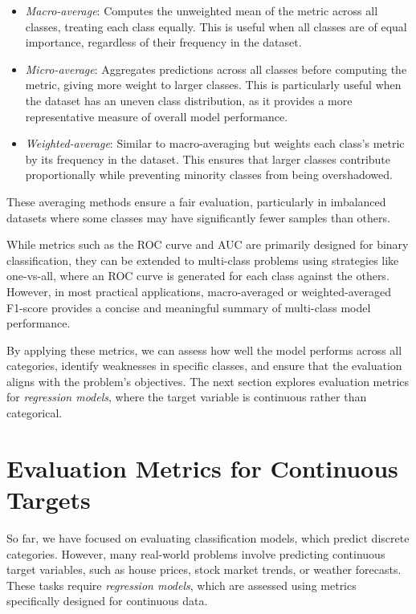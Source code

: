 \documentclass[
  11pt,
]{book}
\providecommand{\tightlist}{%
  \setlength{\itemsep}{0pt}\setlength{\parskip}{0pt}}
\theoremstyle{definition}
\theoremstyle{definition}
\theoremstyle{definition}
\theoremstyle{definition}
\theoremstyle{remark}
\begin{document}
\begin{itemize}
\tightlist
\item
  \emph{Macro-average}: Computes the unweighted mean of the metric across all classes, treating each class equally. This is useful when all classes are of equal importance, regardless of their frequency in the dataset.\\
\item
  \emph{Micro-average}: Aggregates predictions across all classes before computing the metric, giving more weight to larger classes. This is particularly useful when the dataset has an uneven class distribution, as it provides a more representative measure of overall model performance.\\
\item
  \emph{Weighted-average}: Similar to macro-averaging but weights each class's metric by its frequency in the dataset. This ensures that larger classes contribute proportionally while preventing minority classes from being overshadowed.
\end{itemize}

These averaging methods ensure a fair evaluation, particularly in imbalanced datasets where some classes may have significantly fewer samples than others.

While metrics such as the ROC curve and AUC are primarily designed for binary classification, they can be extended to multi-class problems using strategies like one-vs-all, where an ROC curve is generated for each class against the others. However, in most practical applications, macro-averaged or weighted-averaged F1-score provides a concise and meaningful summary of multi-class model performance.

By applying these metrics, we can assess how well the model performs across all categories, identify weaknesses in specific classes, and ensure that the evaluation aligns with the problem's objectives. The next section explores evaluation metrics for \emph{regression models}, where the target variable is continuous rather than categorical.

\section{Evaluation Metrics for Continuous Targets}\label{evaluation-metrics-for-continuous-targets}

So far, we have focused on evaluating classification models, which predict discrete categories. However, many real-world problems involve predicting continuous target variables, such as house prices, stock market trends, or weather forecasts. These tasks require \emph{regression models}, which are assessed using metrics specifically designed for continuous data.
\end{document}

